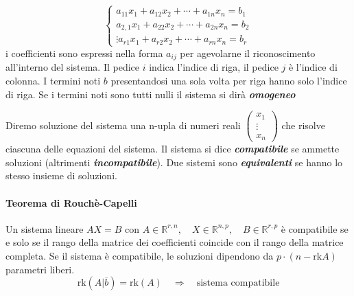 \documentclass[x11names]{article}
\begin{document}
 $$ 
 {\begin{cases}a_{11}x_{1}+a_{12}x_{2}+\cdots +a_{1n}x_{n}=b_{1}\\a_{2,1}x_{1}+a_{22}x_{2}+\cdots +a_{2n}x_{n}=b_{2}\\\vdots a_{r1}x_{1}+a_{r2}x_{2}+\cdots +a_{rn}x_{n}=b_{r}\end{cases}} 
 $$
 i coefficienti sono espressi nella forma $a_{ij}$ per agevolarne il riconoscimento all'interno del sistema. Il  pedice $i$ indica l'indice di riga, il pedice $j$ è l'indice di colonna. I termini noti $b$ presentandosi una sola volta per riga hanno solo l'indice di riga.
 Se i termini noti sono tutti nulli il sistema si dirà \textbf{\textit{omogeneo}}

 Diremo soluzione del sistema una n-upla di numeri reali $\begin{pmatrix}x_{1}\\ \vdots \\ x_{n}\end{pmatrix}$ che risolve ciascuna delle equazioni del sistema. Il sistema si dice \textbf{\textit{compatibile}} se ammette soluzioni (altrimenti \textbf{\textit{incompatibile}}).  Due sistemi sono \textbf{\textit{equivalenti}} se hanno lo stesso insieme di soluzioni. 
 
\begin{center}

\end{center}

\begin{center}
\colorbox{Bisque1}{\begin{minipage}{5.75in}
\begin{yes}{}


\paragraph{Teorema di Rouchè-Capelli}
Un sistema lineare $AX = B$  con $A \in \mathbb{R}^{r,n}, \quad X \in \mathbb{R}^{n,p}, \quad B \in \mathbb{R}^{r,p}$ è compatibile se e solo se il rango della matrice
dei coefficienti coincide con il rango della matrice completa. Se il sistema è compatibile, le soluzioni dipendono da $p \cdot \left(n-\text{rk}A\right)$ parametri liberi.
\[
	\text{rk}\left(A|\overline{b}\right) = \text{rk}\left(A\right) \quad \Rightarrow \quad \text{sistema compatibile}
\] 
\end{yes}
\end{minipage}}        
\end{center}
\end{document}
